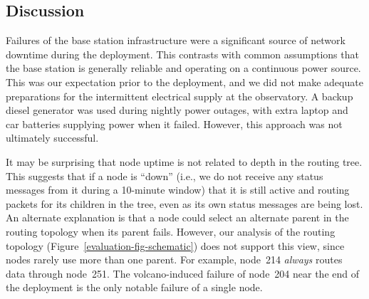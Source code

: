 


\subsection{Discussion}

Failures of the base station infrastructure were a significant source of
network downtime during the deployment.  This contrasts with common
assumptions that the base station is generally reliable and operating on a
continuous power source. This was our expectation prior to the deployment,
and we did not make adequate preparations for the intermittent electrical
supply at the observatory. A backup diesel generator was used during nightly
power outages, with extra laptop and car batteries supplying power when it
failed.  However, this approach was not ultimately successful.

It may be surprising that node uptime is not related to depth in the routing
tree. This suggests that if a node is ``down'' (i.e., we do not receive any
status messages from it during a 10-minute window) that it is still active
and routing packets for its children in the tree, even as its own status
messages are being lost. An alternate explanation is that a node could select
an alternate parent in the routing topology when its parent fails. However,
our analysis of the routing topology (Figure~\ref{evaluation-fig-schematic})
does not support this view, since nodes rarely use more than one parent. For
example, node~214 {\em always} routes data through node~251. The
volcano-induced failure of node~204 near the end of the deployment is the
only notable failure of a single node.

